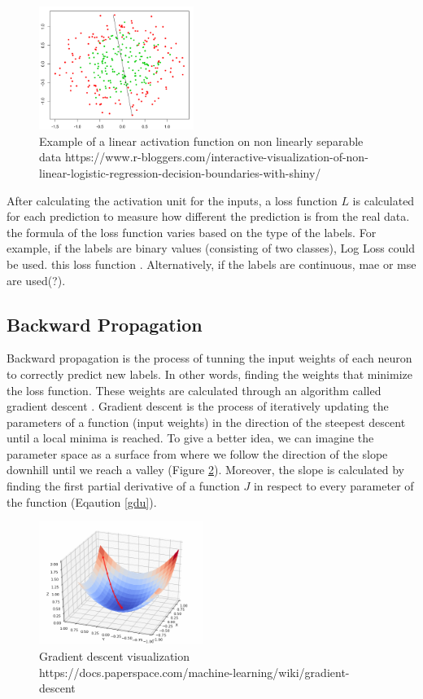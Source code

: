 \documentclass[runningheads]{llncs}
\begin{document}
\begin{figure}[H]
    \label{nls}
    \centering
    \includegraphics[height=4cm]{linear}
    \caption{Example of a linear activation function on non linearly separable data
    https://www.r-bloggers.com/interactive-visualization-of-non-linear-logistic-regression-decision-boundaries-with-shiny/}
\end{figure}

After calculating the activation unit for the inputs, a loss function $L$ is calculated for each prediction to measure 
how different the prediction is from the real data. the formula of the loss function varies based on the type of the labels.
For example, if the labels are binary values (consisting of two classes), 
Log Loss could be used. 
this loss function . Alternatively, if the labels are continuous, 
\gls{mae} or \gls{mse} are used(?).


\subsection{Backward Propagation}

Backward propagation is the process of tunning the input weights of each 
neuron to correctly predict new labels. In other words,
finding the weights that minimize the loss function. These weights are calculated through
an algorithm called gradient descent \cite{lemarechal2012cauchy}. Gradient descent is the process of iteratively updating
the parameters of a function (input weights) in the direction of the steepest descent until a local minima is reached.
To give a better idea, we can imagine the parameter space as a surface from where we follow
the direction of the slope downhill until we reach a valley (Figure \ref{gd}).
Moreover, the slope is calculated by finding the first partial derivative of a function $J$ in respect to every parameter of the function (Eqaution \ref{gdu}). 

\begin{figure}[H]
    \label{gd}
    \centering
    \includegraphics[height=4cm]{gd}
    \caption{Gradient descent visualization
    https://docs.paperspace.com/machine-learning/wiki/gradient-descent}
\end{figure}
\end{document}
